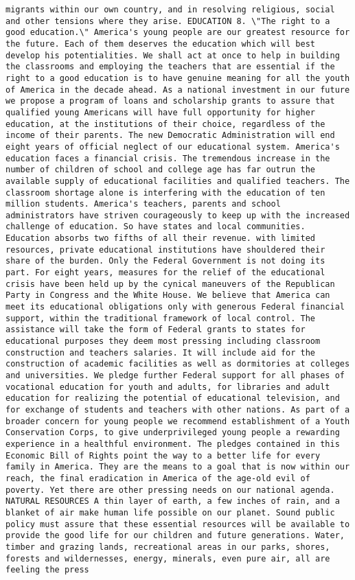 \documentclass[
]{article}
\begin{document}
\begin{verbatim}
migrants within our own country, and in resolving religious, social and other tensions where they arise. EDUCATION 8. \"The right to a good education.\" America's young people are our greatest resource for the future. Each of them deserves the education which will best develop his potentialities. We shall act at once to help in building the classrooms and employing the teachers that are essential if the right to a good education is to have genuine meaning for all the youth of America in the decade ahead. As a national investment in our future we propose a program of loans and scholarship grants to assure that qualified young Americans will have full opportunity for higher education, at the institutions of their choice, regardless of the income of their parents. The new Democratic Administration will end eight years of official neglect of our educational system. America's education faces a financial crisis. The tremendous increase in the number of children of school and college age has far outrun the available supply of educational facilities and qualified teachers. The classroom shortage alone is interfering with the education of ten million students. America's teachers, parents and school administrators have striven courageously to keep up with the increased challenge of education. So have states and local communities. Education absorbs two fifths of all their revenue. with limited resources, private educational institutions have shouldered their share of the burden. Only the Federal Government is not doing its part. For eight years, measures for the relief of the educational crisis have been held up by the cynical maneuvers of the Republican Party in Congress and the White House. We believe that America can meet its educational obligations only with generous Federal financial support, within the traditional framework of local control. The assistance will take the form of Federal grants to states for educational purposes they deem most pressing including classroom construction and teachers salaries. It will include aid for the construction of academic facilities as well as dormitories at colleges and universities. We pledge further Federal support for all phases of vocational education for youth and adults, for libraries and adult education for realizing the potential of educational television, and for exchange of students and teachers with other nations. As part of a broader concern for young people we recommend establishment of a Youth Conservation Corps, to give underprivileged young people a rewarding experience in a healthful environment. The pledges contained in this Economic Bill of Rights point the way to a better life for every family in America. They are the means to a goal that is now within our reach, the final eradication in America of the age-old evil of poverty. Yet there are other pressing needs on our national agenda. NATURAL RESOURCES A thin layer of earth, a few inches of rain, and a blanket of air make human life possible on our planet. Sound public policy must assure that these essential resources will be available to provide the good life for our children and future generations. Water, timber and grazing lands, recreational areas in our parks, shores, forests and wildernesses, energy, minerals, even pure air, all are feeling the press 
\end{verbatim}
\end{document}
